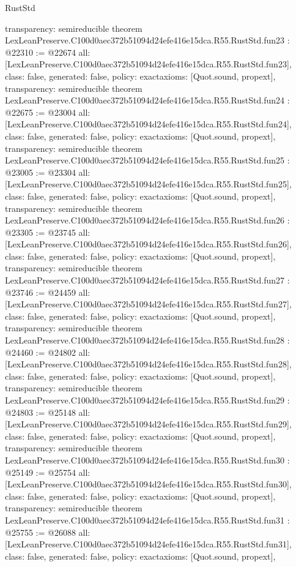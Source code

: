 \begin{lexlean}{RustStd}
\begin{coremodule}
{  transparency: semireducible
}
theorem LexLeanPreserve.C100d0aec372b51094d24efe416e15dca.R55.RustStd.fun23 : @22310 := @22674 {
  all: [LexLeanPreserve.C100d0aec372b51094d24efe416e15dca.R55.RustStd.fun23],
  class: false,
  generated: false,
  policy: exact{axioms: [Quot.sound, propext]},
  transparency: semireducible
}
theorem LexLeanPreserve.C100d0aec372b51094d24efe416e15dca.R55.RustStd.fun24 : @22675 := @23004 {
  all: [LexLeanPreserve.C100d0aec372b51094d24efe416e15dca.R55.RustStd.fun24],
  class: false,
  generated: false,
  policy: exact{axioms: [Quot.sound, propext]},
  transparency: semireducible
}
theorem LexLeanPreserve.C100d0aec372b51094d24efe416e15dca.R55.RustStd.fun25 : @23005 := @23304 {
  all: [LexLeanPreserve.C100d0aec372b51094d24efe416e15dca.R55.RustStd.fun25],
  class: false,
  generated: false,
  policy: exact{axioms: [Quot.sound, propext]},
  transparency: semireducible
}
theorem LexLeanPreserve.C100d0aec372b51094d24efe416e15dca.R55.RustStd.fun26 : @23305 := @23745 {
  all: [LexLeanPreserve.C100d0aec372b51094d24efe416e15dca.R55.RustStd.fun26],
  class: false,
  generated: false,
  policy: exact{axioms: [Quot.sound, propext]},
  transparency: semireducible
}
theorem LexLeanPreserve.C100d0aec372b51094d24efe416e15dca.R55.RustStd.fun27 : @23746 := @24459 {
  all: [LexLeanPreserve.C100d0aec372b51094d24efe416e15dca.R55.RustStd.fun27],
  class: false,
  generated: false,
  policy: exact{axioms: [Quot.sound, propext]},
  transparency: semireducible
}
theorem LexLeanPreserve.C100d0aec372b51094d24efe416e15dca.R55.RustStd.fun28 : @24460 := @24802 {
  all: [LexLeanPreserve.C100d0aec372b51094d24efe416e15dca.R55.RustStd.fun28],
  class: false,
  generated: false,
  policy: exact{axioms: [Quot.sound, propext]},
  transparency: semireducible
}
theorem LexLeanPreserve.C100d0aec372b51094d24efe416e15dca.R55.RustStd.fun29 : @24803 := @25148 {
  all: [LexLeanPreserve.C100d0aec372b51094d24efe416e15dca.R55.RustStd.fun29],
  class: false,
  generated: false,
  policy: exact{axioms: [Quot.sound, propext]},
  transparency: semireducible
}
theorem LexLeanPreserve.C100d0aec372b51094d24efe416e15dca.R55.RustStd.fun30 : @25149 := @25754 {
  all: [LexLeanPreserve.C100d0aec372b51094d24efe416e15dca.R55.RustStd.fun30],
  class: false,
  generated: false,
  policy: exact{axioms: [Quot.sound, propext]},
  transparency: semireducible
}
theorem LexLeanPreserve.C100d0aec372b51094d24efe416e15dca.R55.RustStd.fun31 : @25755 := @26088 {
  all: [LexLeanPreserve.C100d0aec372b51094d24efe416e15dca.R55.RustStd.fun31],
  class: false,
  generated: false,
  policy: exact{axioms: [Quot.sound, propext]},
}
\end{coremodule}
\end{lexlean}
